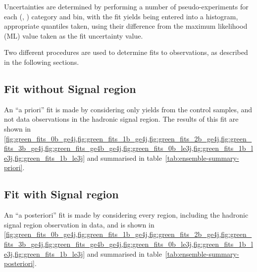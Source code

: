Uncertainties are determined by performing a number of pseudo-experiments for
each (\nb, \nj) category and \HT bin, with the fit yields being entered into a
histogram, appropriate quantiles taken, using their difference from the maximum 
likelihood (ML) value taken as the fit uncertainty value.

Two different procedures are used to determine fits to observations, as described
in the following sections.

\subsection{Fit without Signal region}
\label{sec:results_fit_green}
An ``a priori'' fit is made by considering only yields from the control samples,
and not data observations in the hadronic signal region. The results of this fit
are shown in \cref{fig:green_fits_0b_ge4j,fig:green_fits_1b_ge4j,fig:green_fits_2b_ge4j,fig:green_fits_3b_ge4j,fig:green_fits_ge4b_ge4j,fig:green_fits_0b_le3j,fig:green_fits_1b_le3j,fig:green_fits_1b_le3j}
and summarised in table~\ref{tab:ensemble-summary-priori}.


\subsection{Fit with Signal region}
An ``a posteriori'' fit is made by considering every region, including the
hadronic signal region observation in data, and is shown in
\cref{fig:green_fits_0b_ge4j,fig:green_fits_1b_ge4j,fig:green_fits_2b_ge4j,fig:green_fits_3b_ge4j,fig:green_fits_ge4b_ge4j,fig:green_fits_0b_le3j,fig:green_fits_1b_le3j,fig:green_fits_1b_le3j}
and summarised in table~\ref{tab:ensemble-summary-posteriori}.

